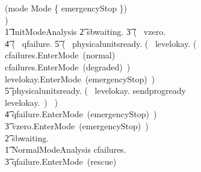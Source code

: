 \documentclass{report} %
\begin{document}
\begin{circus}
                \extchoice \lcircguard (mode \notin Mode \setminus \{ emergencyStop \}) \rcircguard \circguard\ \Skip \\
                ) \\
        \t1 InitModeAnalysis \circdef 
            \t2 sbwaiting.\true \then 
                \t3 (~ vzero.\true \then \\
                    \t4 (~ qfailure.\false \then 
                        \t5 (~ physicalunitsready.\true \then 
                                (~ levelokay.\true \then 
                                    (~ cfailures.\false \then EnterMode~(normal) \extchoice \\
                                       cfailures.\true \then EnterMode~(degraded)~) \extchoice \\
                                   levelokay.\false \then EnterMode~(emergencyStop)~) \extchoice \\
                        \t5 physicalunitsready.\false \then 
                                (~ levelokay.\true \then 
                                    sendprogready \then \Skip \extchoice \\
                                   levelokay.\false \then \Skip~) ~) \extchoice \\
                     \t4 qfailure.\true \then EnterMode~(emergencyStop)~) \extchoice \\
                \t3 vzero.\false \then EnterMode~(emergencyStop)~) \extchoice\\
            \t2 sbwaiting.\false \then \Skip \\
        \t1 NormalModeAnalysis \circdef cfailures.\false \then \Skip \extchoice \\
            \t3 qfailure.\true \then EnterMode~(rescue) \extchoice \\

\end{circus}
\end{document}
